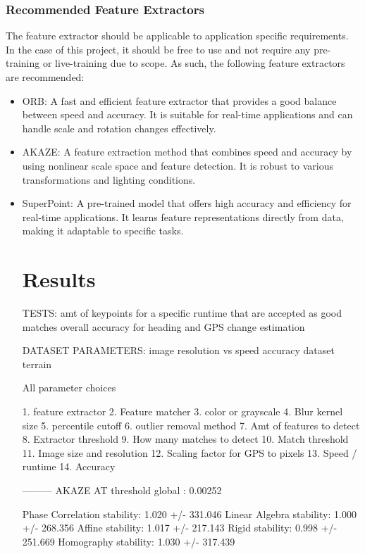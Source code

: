 \subsection{Recommended Feature Extractors}
The feature extractor should be applicable to application specific requirements. In the case of this project, it should be free to use and not require any pre-training or live-training due to scope. As such, the following feature extractors are recommended:
\begin{itemize}
    \item ORB: A fast and efficient feature extractor that provides a good balance between speed and accuracy. It is suitable for real-time applications and can handle scale and rotation changes effectively.
    \item AKAZE: A feature extraction method that combines speed and accuracy by using nonlinear scale space and feature detection. It is robust to various transformations and lighting conditions.
    \item SuperPoint: A pre-trained model that offers high accuracy and efficiency for real-time applications. It learns feature representations directly from data, making it adaptable to specific tasks.


    


\chapter{Results}

TESTS:
amt of keypoints for a specific runtime that are accepted as good matches
overall accuracy for heading and GPS change estimation


DATASET PARAMETERS:
image resolution vs speed accuracy
dataset terrain



All parameter choices

1. feature extractor
2. Feature matcher
3. color or grayscale
4. Blur kernel size
5. percentile cutoff
6. outlier removal method
7. Amt of features to detect
8. Extractor threshold
9. How many matches to detect
10. Match threshold
11. Image size and resolution
12. Scaling factor for GPS to pixels
13. Speed / runtime
14. Accuracy   




--------- AKAZE
AT threshold global : 0.00252

Phase Correlation stability: 1.020 +/- 331.046
Linear Algebra stability: 1.000 +/- 268.356
Affine stability: 1.017 +/- 217.143
Rigid stability: 0.998 +/- 251.669
Homography stability: 1.030 +/- 317.439


\end{itemize}
